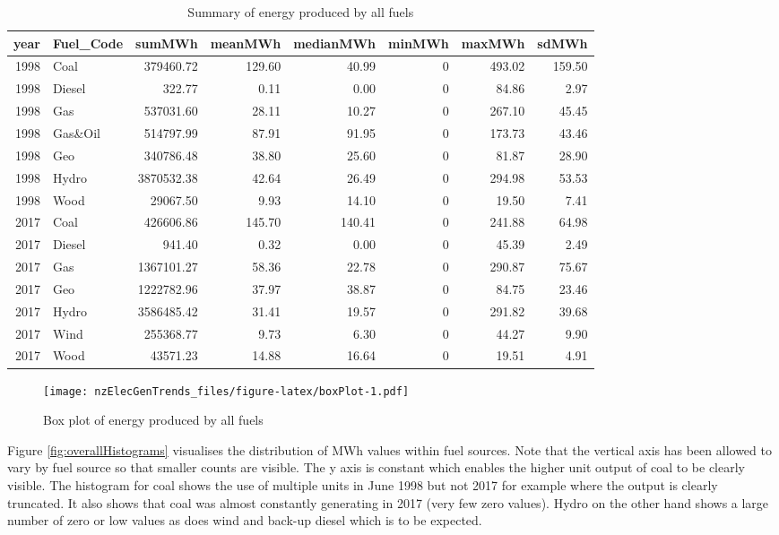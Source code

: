\documentclass[]{article}
\theoremstyle{definition}
\theoremstyle{definition}
\theoremstyle{definition}
\theoremstyle{remark}
\begin{document}
\begin{table}

\caption{\label{tab:boxPlot}Summary of energy produced by all fuels}
\centering
\begin{tabular}[t]{r|l|r|r|r|r|r|r}
\hline
year & Fuel\_Code & sumMWh & meanMWh & medianMWh & minMWh & maxMWh & sdMWh\\
\hline
1998 & Coal & 379460.72 & 129.60 & 40.99 & 0 & 493.02 & 159.50\\
\hline
1998 & Diesel & 322.77 & 0.11 & 0.00 & 0 & 84.86 & 2.97\\
\hline
1998 & Gas & 537031.60 & 28.11 & 10.27 & 0 & 267.10 & 45.45\\
\hline
1998 & Gas\&Oil & 514797.99 & 87.91 & 91.95 & 0 & 173.73 & 43.46\\
\hline
1998 & Geo & 340786.48 & 38.80 & 25.60 & 0 & 81.87 & 28.90\\
\hline
1998 & Hydro & 3870532.38 & 42.64 & 26.49 & 0 & 294.98 & 53.53\\
\hline
1998 & Wood & 29067.50 & 9.93 & 14.10 & 0 & 19.50 & 7.41\\
\hline
2017 & Coal & 426606.86 & 145.70 & 140.41 & 0 & 241.88 & 64.98\\
\hline
2017 & Diesel & 941.40 & 0.32 & 0.00 & 0 & 45.39 & 2.49\\
\hline
2017 & Gas & 1367101.27 & 58.36 & 22.78 & 0 & 290.87 & 75.67\\
\hline
2017 & Geo & 1222782.96 & 37.97 & 38.87 & 0 & 84.75 & 23.46\\
\hline
2017 & Hydro & 3586485.42 & 31.41 & 19.57 & 0 & 291.82 & 39.68\\
\hline
2017 & Wind & 255368.77 & 9.73 & 6.30 & 0 & 44.27 & 9.90\\
\hline
2017 & Wood & 43571.23 & 14.88 & 16.64 & 0 & 19.51 & 4.91\\
\hline
\end{tabular}
\end{table}

\begin{figure}
\centering
\texttt{[image: nzElecGenTrends\_files/figure-latex/boxPlot-1.pdf]}
\caption{\label{fig:boxPlot}Box plot of energy produced by all fuels}
\end{figure}

Figure \ref{fig:overallHistograms} visualises the distribution of MWh
values within fuel sources. Note that the vertical axis has been allowed
to vary by fuel source so that smaller counts are visible. The y axis is
constant which enables the higher unit output of coal to be clearly
visible. The histogram for coal shows the use of multiple units in June
1998 but not 2017 for example where the output is clearly truncated. It
also shows that coal was almost constantly generating in 2017 (very few
zero values). Hydro on the other hand shows a large number of zero or
low values as does wind and back-up diesel which is to be expected.
\end{document}

